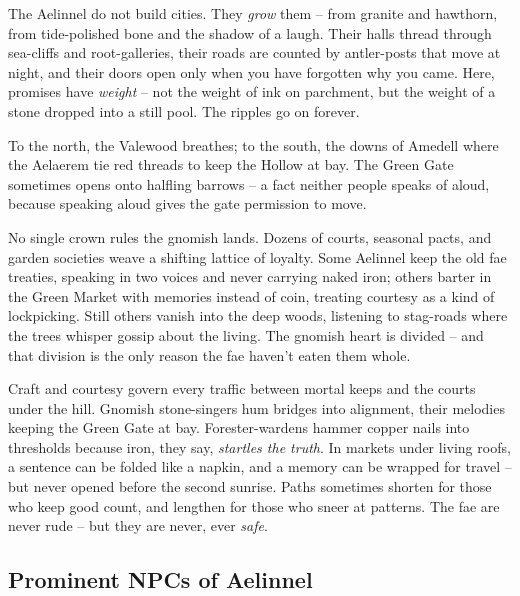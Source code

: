 \vspace{2mm}
\begin{tcolorbox}[colback=black!3,colframe=blue!60!black,title={Stone, Bough, and Bright Things},breakable]
The Aelinnel do not build cities. They \emph{grow} them -- from granite and hawthorn, from tide-polished bone and the shadow of a laugh. Their halls thread through sea-cliffs and root-galleries, their roads are counted by antler-posts that move at night, and their doors open only when you have forgotten why you came. Here, promises have \emph{weight} -- not the weight of ink on parchment, but the weight of a stone dropped into a still pool. The ripples go on forever.

To the north, the Valewood breathes; to the south, the downs of Amedell where the Aelaerem tie red threads to keep the Hollow at bay. The Green Gate sometimes opens onto halfling barrows -- a fact neither people speaks of aloud, because speaking aloud gives the gate permission to move.

No single crown rules the gnomish lands. Dozens of courts, seasonal pacts, and garden societies weave a shifting lattice of loyalty. Some Aelinnel keep the old fae treaties, speaking in two voices and never carrying naked iron; others barter in the Green Market with memories instead of coin, treating courtesy as a kind of lockpicking. Still others vanish into the deep woods, listening to stag-roads where the trees whisper gossip about the living. The gnomish heart is divided -- and that division is the only reason the fae haven't eaten them whole.

Craft and courtesy govern every traffic between mortal keeps and the courts under the hill. Gnomish stone-singers hum bridges into alignment, their melodies keeping the Green Gate at bay. Forester-wardens hammer copper nails into thresholds because iron, they say, \emph{startles the truth}. In markets under living roofs, a sentence can be folded like a napkin, and a memory can be wrapped for travel -- but never opened before the second sunrise. Paths sometimes shorten for those who keep good count, and lengthen for those who sneer at patterns. The fae are never rude -- but they are never, ever \emph{safe}.
\end{tcolorbox}

\subsection*{Prominent NPCs of Aelinnel}
\label{sec:aelinnel-npcs}

